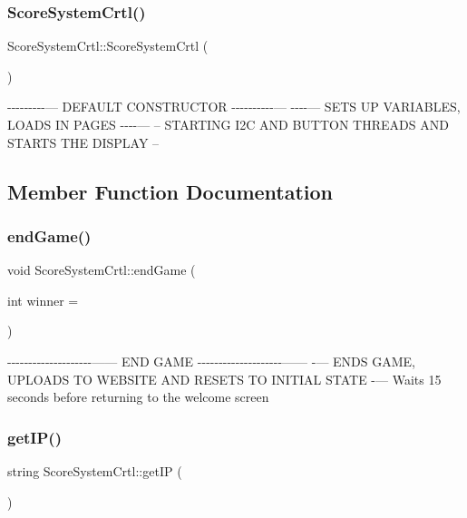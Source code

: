 \subsubsection{\texorpdfstring{Score\+System\+Crtl()}{ScoreSystemCrtl()}}
{\footnotesize\ttfamily Score\+System\+Crtl\+::\+Score\+System\+Crtl (\begin{DoxyParamCaption}{ }\end{DoxyParamCaption})}

-\/-\/-\/-\/-\/-\/-\/-\/-\/--- D\+E\+F\+A\+U\+LT C\+O\+N\+S\+T\+R\+U\+C\+T\+OR -\/-\/-\/-\/-\/-\/-\/-\/-\/-\/--- -\/-\/-\/-\/--- S\+E\+TS UP V\+A\+R\+I\+A\+B\+L\+ES, L\+O\+A\+DS IN P\+A\+G\+ES -\/-\/-\/-\/--- -- S\+T\+A\+R\+T\+I\+NG I2C A\+ND B\+U\+T\+T\+ON T\+H\+R\+E\+A\+DS A\+ND S\+T\+A\+R\+TS T\+HE D\+I\+S\+P\+L\+AY -- 

\subsection{Member Function Documentation}
\mbox{\label{class_score_system_crtl_a4cfa5045fdaa955fc3a1c183a3698ec9}} 
\subsubsection{\texorpdfstring{end\+Game()}{endGame()}}
{\footnotesize\ttfamily void Score\+System\+Crtl\+::end\+Game (\begin{DoxyParamCaption}\item[{int}]{winner = {} }\end{DoxyParamCaption})\hspace{0.3cm}{\ttfamily [private]}}

-\/-\/-\/-\/-\/-\/-\/-\/-\/-\/-\/-\/-\/-\/-\/-\/-\/-\/-\/-\/------ E\+ND G\+A\+ME -\/-\/-\/-\/-\/-\/-\/-\/-\/-\/-\/-\/-\/-\/-\/-\/-\/-\/-\/-\/------ -\/--- E\+N\+DS G\+A\+ME, U\+P\+L\+O\+A\+DS TO W\+E\+B\+S\+I\+TE A\+ND R\+E\+S\+E\+TS TO I\+N\+I\+T\+I\+AL S\+T\+A\+TE -\/--- Waits 15 seconds before returning to the welcome screen \mbox{\label{class_score_system_crtl_ae15d59e88b416b1f13249c3f1a1edafa}} 
\subsubsection{\texorpdfstring{get\+I\+P()}{getIP()}}
{\footnotesize\ttfamily string Score\+System\+Crtl\+::get\+IP (\begin{DoxyParamCaption}{ }\end{DoxyParamCaption})\hspace{0.3cm}{\ttfamily [private]}}

